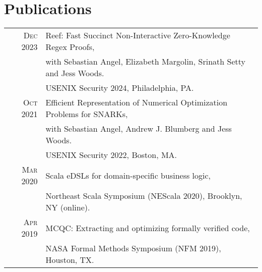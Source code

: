 \documentclass[lettersize,11pt]{article}
\begin{document}
\section{Publications}
\begin{tabular}{rl}
    \textsc{Dec} 2023 & Reef: Fast Succinct Non-Interactive Zero-Knowledge Regex Proofs, \\
                      & with Sebastian Angel, Elizabeth Margolin, Srinath Setty and Jess Woods. \\
                      & USENIX Security 2024, Philadelphia, PA.  \\[0.5em]
    \textsc{Oct} 2021 & Efficient Representation of Numerical Optimization Problems for SNARKs, \\
                      & with Sebastian Angel, Andrew J. Blumberg and Jess Woods. \\
                      & USENIX Security 2022, Boston, MA.  \\[0.5em]
    \textsc{Mar} 2020 & Scala eDSLs for domain-specific business logic, \\
                      & Northeast Scala Symposium (NEScala 2020), Brooklyn, NY (online). \\[0.5em]
    \textsc{Apr} 2019 & MCQC: Extracting and optimizing formally verified code, \\
                      & NASA Formal Methods Symposium (NFM 2019), Houston, TX. \\
\end{tabular}
\end{document}

